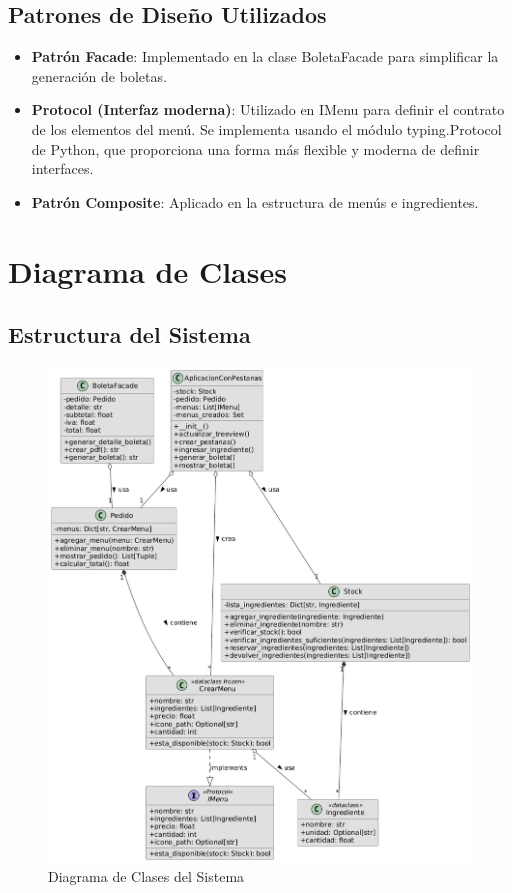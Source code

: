 \documentclass[12pt,letterpaper]{article}
\begin{document}
\subsection{Patrones de Diseño Utilizados}
\begin{itemize}
    \item \textbf{Patrón Facade}: Implementado en la clase BoletaFacade para simplificar la generación de boletas.
    \item \textbf{Protocol (Interfaz moderna)}: Utilizado en IMenu para definir el contrato de los elementos del menú. Se implementa usando el módulo typing.Protocol de Python, que proporciona una forma más flexible y moderna de definir interfaces.
    \item \textbf{Patrón Composite}: Aplicado en la estructura de menús e ingredientes.
\end{itemize}

\section{Diagrama de Clases}
\subsection{Estructura del Sistema}
\begin{figure}[H]
    \centering
    \includegraphics[width=\textwidth]{./images/diagrama.png}
    \caption{Diagrama de Clases del Sistema}\label{fig:diagrama}
\end{figure}
\end{document}
